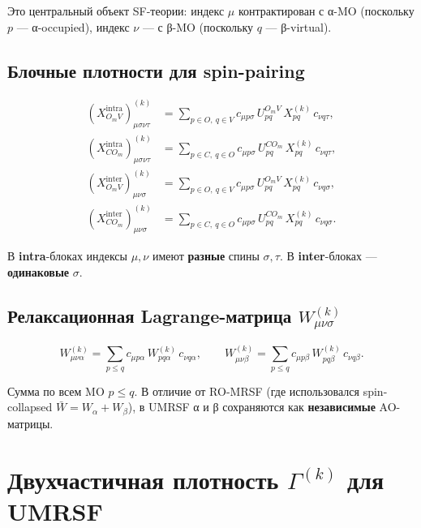 \documentclass[11pt, a4paper]{article}
\theoremstyle{definition}
\begin{document}
Это центральный объект SF-теории: индекс $\mu$ контрактирован с α-MO (поскольку $p$ --- α-occupied), индекс $\nu$ --- с β-MO (поскольку $q$ --- β-virtual).

\subsection{Блочные плотности для spin-pairing}

\begin{align}
    (X^{\text{intra}}_{O_m V})^{(k)}_{\mu\sigma\nu\tau} &= \sum_{p \in O,\ q \in V} c_{\mu p \sigma}\, U^{O_m V}_{pq}\, X^{(k)}_{pq}\, c_{\nu q \tau}, \\
    (X^{\text{intra}}_{CO_m})^{(k)}_{\mu\sigma\nu\tau} &= \sum_{p \in C,\ q \in O} c_{\mu p \sigma}\, U^{CO_m}_{pq}\, X^{(k)}_{pq}\, c_{\nu q \tau}, \\
    (X^{\text{inter}}_{O_m V})^{(k)}_{\mu\nu\sigma} &= \sum_{p \in O,\ q \in V} c_{\mu p \sigma}\, U^{O_m V}_{pq}\, X^{(k)}_{pq}\, c_{\nu q \sigma}, \\
    (X^{\text{inter}}_{CO_m})^{(k)}_{\mu\nu\sigma} &= \sum_{p \in C,\ q \in O} c_{\mu p \sigma}\, U^{CO_m}_{pq}\, X^{(k)}_{pq}\, c_{\nu q \sigma}.
\end{align}

В \textbf{intra}-блоках индексы $\mu, \nu$ имеют \textbf{разные} спины $\sigma, \tau$. В \textbf{inter}-блоках --- \textbf{одинаковые} $\sigma$.

\subsection{Релаксационная Lagrange-матрица $W^{(k)}_{\mu\nu\sigma}$}

\begin{equation}
    W^{(k)}_{\mu\nu\alpha} = \sum_{p \le q} c_{\mu p \alpha}\, W^{(k)}_{pq\alpha}\, c_{\nu q \alpha}, \qquad
    W^{(k)}_{\mu\nu\beta} = \sum_{p \le q} c_{\mu p \beta}\, W^{(k)}_{pq\beta}\, c_{\nu q \beta}.
\end{equation}

Сумма по всем MO $p \le q$. В отличие от RO-MRSF (где использовался spin-collapsed $\bar W = W_\alpha + W_\beta$), в UMRSF α и β сохраняются как \textbf{независимые} AO-матрицы.

\section{Двухчастичная плотность $\Gamma^{(k)}$ для UMRSF}
\label{sec:Gamma}
\end{document}
